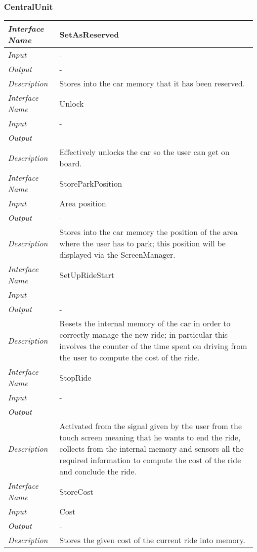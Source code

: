 \documentclass[11pt,a4paper]{report}
\begin{document}
\subsubsection{CentralUnit}
	\begin{tabularx}{\textwidth}{|>{\em}l|X|}
		\hline
		Interface Name& SetAsReserved\\
		\hline
		Input & -\\
		\hline
		Output & -\\
		\hline
		Description &Stores into the car memory that it has been reserved.\\
		\hline
		\hline
		Interface Name& Unlock\\
		\hline
		Input & -\\
		\hline
		Output & -\\
		\hline
		Description &Effectively unlocks the car so the user can get on board.\\
		\hline
		\hline
		Interface Name& StoreParkPosition\\
		\hline
		Input & Area position\\
		\hline
		Output & -\\
		\hline
		Description &Stores into the car memory the position of the area where the user has to park; this position will be displayed via the ScreenManager.\\
		\hline
		\hline
		Interface Name& SetUpRideStart\\
		\hline
		Input & -\\
		\hline
		Output & -\\
		\hline
		Description &Resets the internal memory of the car in order to correctly manage the new ride; in particular this involves the counter of the time spent on driving from the user to compute the cost of the ride.\\
		\hline
		\hline
		Interface Name& StopRide\\
		\hline
		Input & -\\
		\hline
		Output & -\\
		\hline
		Description &Activated from the signal given by the user from the touch screen meaning that he wants to end the ride, collects from the internal memory and sensors all the required information to compute the cost of the ride and conclude the ride. \\
		\hline
		\hline
		Interface Name& StoreCost\\
		\hline
		Input & Cost\\
		\hline
		Output & -\\
		\hline
		Description &Stores the given cost of the current ride into memory.\\

\end{tabularx}
\end{document}
